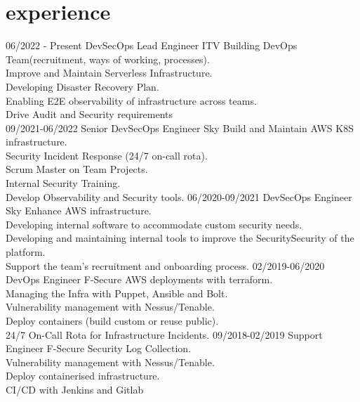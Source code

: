 \documentclass[]{twentysecondcv}
\begin{document}
\section{experience}
\begin{twenty}
  \twentyitem
  {06/2022 - Present}
  {DevSecOps Lead Engineer}
  {ITV}
  {Building DevOps Team(recruitment, ways of working, processes).\\
    Improve and Maintain Serverless Infrastructure.\\
    Developing Disaster Recovery Plan.\\
    Enabling E2E observability of infrastructure across teams.\\
    Drive Audit and Security requirements\\
  }
  \twentyitem
  {09/2021-06/2022}
  {Senior DevSecOps Engineer}
  {Sky}
  {Build and Maintain AWS K8S infrastructure.\\
    Security Incident Response (24/7 on-call rota).\\
    Scrum Master on Team Projects.\\
    Internal Security Training.\\
    Develop Observability and Security tools.
  }
  \twentyitem
  {06/2020-09/2021}
  {DevSecOps Engineer}
  {Sky}
  {Enhance AWS infrastructure.\\
    Developing internal software to accommodate custom security needs.\\
    Developing and maintaining internal tools to improve the SecuritySecurity of the platform.\\
    Support the team's recruitment and onboarding process.
  }
  \twentyitem
  {02/2019-06/2020}
  {DevOps Engineer}
  {F-Secure}
  {AWS deployments with terraform.\\
    Managing the Infra with Puppet, Ansible and Bolt.\\
    Vulnerability management with Nessus/Tenable.\\
    Deploy containers (build custom or reuse public).\\
    24/7 On-Call Rota for Infrastructure Incidents.
  }
  \twentyitem
  {09/2018-02/2019}
  {Support Engineer}
  {F-Secure}
  {Security Log Collection.\\
    Vulnerability management with Nessus/Tenable.\\
    Deploy containerised infrastructure.\\
    CI/CD with Jenkins and Gitlab
  }
\end{twenty}
\end{document}
